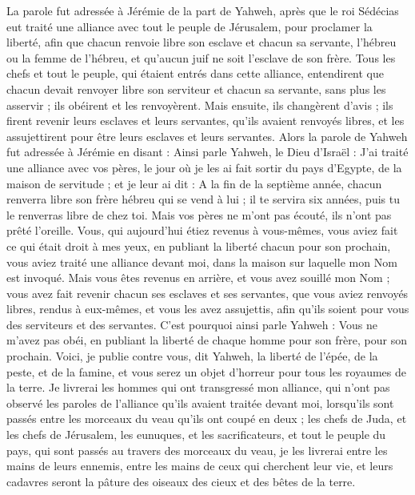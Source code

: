 \begin{multicols}{2}
La parole fut adressée à Jérémie de la part de Yahweh, après que le roi Sédécias eut traité une alliance avec tout le peuple de Jérusalem, pour proclamer la liberté,
afin que chacun renvoie libre son esclave et chacun sa servante, l’hébreu ou la femme de l’hébreu, et qu’aucun juif ne soit l'esclave de son frère.
Tous les chefs et tout le peuple, qui étaient entrés dans cette alliance, entendirent que chacun devait renvoyer libre son serviteur et chacun sa servante, sans plus les asservir ; ils obéirent et les renvoyèrent.
Mais ensuite, ils changèrent d'avis ; ils firent revenir leurs esclaves et leurs servantes, qu'ils avaient renvoyés libres, et les assujettirent pour être leurs esclaves et leurs servantes.
Alors la parole de Yahweh fut adressée à Jérémie en disant :
Ainsi parle Yahweh, le Dieu d'Israël : J’ai traité une alliance avec vos pères, le jour où je les ai fait sortir du pays d'Egypte, de la maison de servitude ; et je leur ai dit :
A la fin de la septième année, chacun renverra libre son frère hébreu qui se vend à lui ; il te servira six années, puis tu le renverras libre de chez toi. Mais vos pères ne m'ont pas écouté, ils n'ont pas prêté l’oreille.
Vous, qui aujourd'hui étiez revenus à vous-mêmes, vous aviez fait ce qui était droit à mes yeux, en publiant la liberté chacun pour son prochain, vous aviez traité une alliance devant moi, dans la maison sur laquelle mon Nom est invoqué.
Mais vous êtes revenus en arrière, et vous avez souillé mon Nom ; vous avez fait revenir chacun ses esclaves et ses servantes, que vous aviez renvoyés libres, rendus à eux-mêmes, et vous les avez assujettis, afin qu'ils soient pour vous des serviteurs et des servantes.
C'est pourquoi ainsi parle Yahweh : Vous ne m'avez pas obéi, en publiant la liberté de chaque homme pour son frère, pour son prochain. Voici, je publie contre vous, dit Yahweh, la liberté de l'épée, de la peste, et de la famine, et vous serez un objet d’horreur pour tous les royaumes de la terre.
Je livrerai les hommes qui ont transgressé mon alliance, qui n'ont pas observé les paroles de l'alliance qu'ils avaient traitée devant moi, lorsqu'ils sont passés entre les morceaux du veau qu'ils ont coupé en deux ;
les chefs de Juda, et les chefs de Jérusalem, les eunuques, et les sacrificateurs, et tout le peuple du pays, qui sont passés au travers des morceaux du veau,
je les livrerai entre les mains de leurs ennemis, entre les mains de ceux qui cherchent leur vie, et leurs cadavres seront la pâture des oiseaux des cieux et des bêtes de la terre.

\end{multicols}
